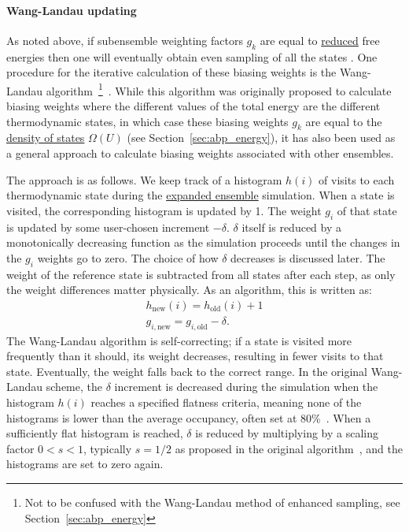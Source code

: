 \documentclass[9pt,review]{livecoms}
\begin{document}
\paragraph{Wang-Landau updating}
As noted above, if subensemble weighting factors $g_k$ are equal to \hyperlink{ref:reduced} {reduced} free energies then one will eventually obtain even sampling of all the states
\cite{lyubartsev:jcp:1992:expanded-ensembles}.  One procedure for the
iterative calculation of these biasing weights is the Wang-Landau
algorithm~\footnote{Not to be confused with the Wang-Landau method of enhanced sampling, see Section~\ref{sec:abp_energy}}~\cite{wang-landau:prl:2001:wang-landau}. While this algorithm was originally proposed to calculate biasing weights where the different values of the total energy are the different thermodynamic states, in which case these biasing weights $g_k$ are equal to the \hyperlink{ref:density_of_states} {density of states} $\Omega(U)$ (see Section~\ref{sec:abp_energy}), it has also been used as a general approach to calculate biasing weights associated with other ensembles.

The approach is as follows. We keep track of a histogram $h(i)$ of visits to each thermodynamic state during the \hyperlink{ref:ExpEns} {expanded ensemble} simulation.  When a state is visited, the corresponding
histogram is updated by 1.  The weight $g_i$ of that state is updated by some user-chosen increment $-\delta$.  $\delta$ itself is reduced by a monotonically decreasing function as the simulation proceeds until the changes in the $g_i$ weights go to zero. The choice of how $\delta$ decreases is discussed later. The
weight of the reference state is subtracted from all states after each step, as only the weight differences matter physically. As an algorithm, this is written as:
\begin{eqnarray}
h_{\mathrm{new}}(i) = h_{\mathrm{old}}(i) + 1 \\
g_{i,\mathrm{new}} = g_{i,\mathrm{old}} - \delta.
\label{eq:wang-landau}
\end{eqnarray}
The Wang-Landau algorithm is self-correcting; if a state is visited more frequently than it should, its weight decreases, resulting in fewer visits to that state.  Eventually, the weight falls back to the correct range.  In the original Wang-Landau scheme, the $\delta$ increment is decreased during the simulation when the histogram $h(i)$ reaches a specified flatness criteria, meaning none of the histograms is lower than the average occupancy, often set at 80\%~\cite{wang-landau:prl:2001:wang-landau}.  When a sufficiently flat histogram is reached, $\delta$ is reduced by multiplying by a scaling factor $0<s<1$, typically $s=1/2$ as proposed in the original algorithm~\cite{wang-landau:prl:2001:wang-landau}, and the histograms are set to zero again.
\end{document}

